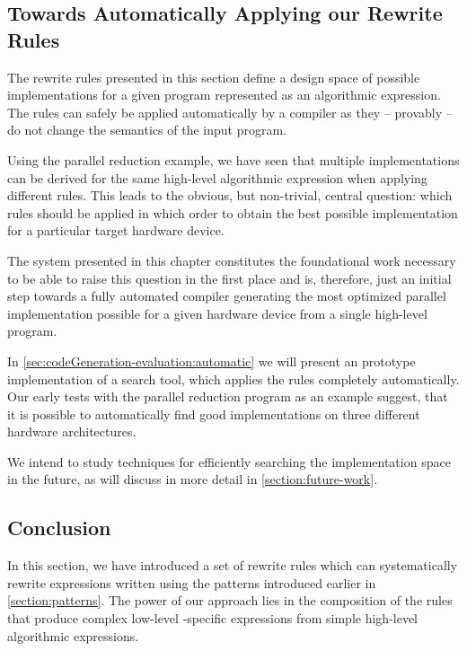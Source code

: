 \FloatBarrier

\subsection{Towards Automatically Applying our Rewrite Rules}
The rewrite rules presented in this section define a design space of possible implementations for a given program represented as an algorithmic expression.
The rules can safely be applied automatically by a compiler as they -- provably -- do not change the semantics of the input program.

Using the parallel reduction example, we have seen that multiple implementations can be derived for the same high-level algorithmic expression when applying different rules.
This leads to the obvious, but non-trivial, central question:
which rules should be applied in which order to obtain the best possible implementation for a particular target hardware device.

The system presented in this chapter constitutes the foundational work necessary to be able to raise this question in the first place and is, therefore, just an initial step towards a fully automated compiler generating the most optimized parallel implementation possible for a given hardware device from a single high-level program.

In \autoref{sec:codeGeneration-evaluation:automatic} we will present an prototype implementation of a search tool, which applies the rules completely automatically.
Our early tests with the parallel reduction program as an example suggest, that it is possible to automatically find good implementations on three different hardware architectures.

We intend to study techniques for efficiently searching the implementation space in the future, as will discuss in more detail in \autoref{section:future-work}.



\subsection{Conclusion}
In this section, we have introduced a set of rewrite rules which can systematically rewrite expressions written using the patterns introduced earlier in \autoref{section:patterns}.
The power of our approach lies in the composition of the rules that produce complex low-level \OpenCL-specific expressions from simple high-level algorithmic expressions.

